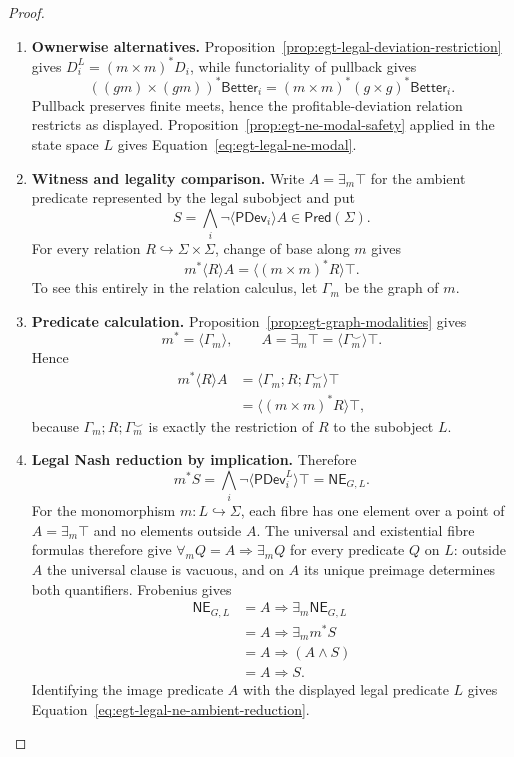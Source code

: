 \documentclass[11pt,a4paper]{article}
\numberwithin{equation}{section}
\theoremstyle{definition}
\theoremstyle{remark}
\theoremstyle{plain}
\begin{document}
\begin{proof}
\leavevmode
\begin{enumerate}[label=\textup{(\arabic*)},leftmargin=*,itemsep=4pt,topsep=3pt]
  \item \textbf{Ownerwise alternatives.} Proposition~\ref{prop:egt-legal-deviation-restriction} gives
$D_i^L=(m\times m)^*D_i$, while functoriality of pullback gives
\[
 ((gm)\times(gm))^*\mathsf{Better}_i
 =(m\times m)^*(g\times g)^*\mathsf{Better}_i.
\]
Pullback preserves finite meets, hence the profitable-deviation relation
restricts as displayed. Proposition~\ref{prop:egt-ne-modal-safety} applied in
the state space $L$ gives
Equation~\eqref{eq:egt-legal-ne-modal}.
  \item \textbf{Witness and legality comparison.} Write $A=\exists_m\top$ for the ambient predicate represented by the legal
subobject and put
\[
 S=\bigwedge_i\neg\langle\mathsf{PDev}_i\rangle A
 \in\mathsf{Pred}(\Sigma).
\]
For every relation $R\hookrightarrow\Sigma\times\Sigma$, change of base along
$m$ gives
\begin{equation}
\label{eq:egt-restricted-diamond}
 m^*\langle R\rangle A
 =\langle(m\times m)^*R\rangle\top.
\end{equation}
To see this entirely in the relation calculus, let $\Gamma_m$ be the graph of
$m$.
  \item \textbf{Predicate calculation.} Proposition~\ref{prop:egt-graph-modalities} gives
\[
 m^*=\langle\Gamma_m\rangle,
 \qquad
 A=\exists_m\top=\langle\Gamma_m^{\smile}\rangle\top.
\]
Hence
\begin{align*}
 m^*\langle R\rangle A
 &=\langle\Gamma_m;R;\Gamma_m^{\smile}\rangle\top\\
 &=\langle(m\times m)^*R\rangle\top,
\end{align*}
because $\Gamma_m;R;\Gamma_m^{\smile}$ is exactly the restriction of $R$ to
the subobject $L$.
  \item \textbf{Legal Nash reduction by implication.} Therefore
\[
 m^*S
 =\bigwedge_i\neg\langle\mathsf{PDev}_i^L\rangle\top
 =\mathsf{NE}_{G,L}.
\]
For the monomorphism $m:L\hookrightarrow\Sigma$, each fibre has
one element over a point of $A=\exists_m\top$ and no elements
outside $A$. The universal and existential fibre formulas therefore
give $\forall_m Q=A\Rightarrow\exists_m Q$ for every predicate
$Q$ on $L$: outside $A$ the universal clause is vacuous, and on
$A$ its unique preimage determines both quantifiers. Frobenius gives
\begin{align*}
 [!m]\mathsf{NE}_{G,L}
 &=A\Rightarrow\exists_m\mathsf{NE}_{G,L}\\
 &=A\Rightarrow\exists_m m^*S\\
 &=A\Rightarrow(A\wedge S)\\
 &=A\Rightarrow S.
\end{align*}
Identifying the image predicate $A$ with the displayed legal predicate $L$
gives Equation~\eqref{eq:egt-legal-ne-ambient-reduction}.
\end{enumerate}
\end{proof}
\end{document}
